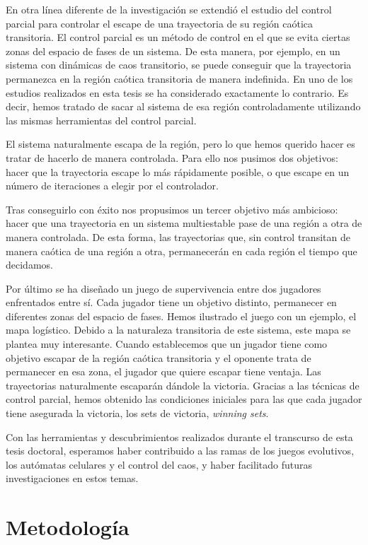 En otra línea diferente de la investigación se extendió el estudio del control parcial para controlar el escape de una trayectoria de su región caótica transitoria. El control parcial es un método de control en el que se evita ciertas zonas del espacio de fases de un sistema. De esta manera, por ejemplo, en un sistema con dinámicas de caos transitorio, se puede conseguir que la trayectoria permanezca en la región caótica transitoria de manera indefinida. En uno de los estudios realizados en esta tesis se ha considerado exactamente lo contrario. Es decir, hemos tratado de sacar al sistema de esa región controladamente utilizando las mismas herramientas del control parcial.

El sistema naturalmente escapa de la región, pero lo que hemos querido hacer es tratar de hacerlo de manera controlada. Para ello nos pusimos dos objetivos: hacer que la trayectoria escape lo más rápidamente posible, o que escape en un número de iteraciones a elegir por el controlador. 

Tras conseguirlo con éxito nos propusimos un tercer objetivo más ambicioso: hacer que una trayectoria en un sistema multiestable pase de una región a otra de manera controlada. De esta forma, las trayectorias que, sin control transitan de manera caótica de una región a otra, permanecerán en cada región el tiempo que decidamos. 

Por último se ha diseñado un juego de supervivencia entre dos jugadores enfrentados entre sí. Cada jugador tiene un objetivo distinto, permanecer en diferentes zonas del espacio de fases. Hemos ilustrado el juego con un ejemplo, el mapa logístico. Debido a la naturaleza transitoria de este sistema, este mapa se plantea muy interesante. Cuando establecemos que un jugador tiene como objetivo escapar de la región caótica transitoria y el oponente trata de permanecer en esa zona, el jugador que quiere escapar tiene ventaja. Las trayectorias naturalmente escaparán dándole la victoria. Gracias a las técnicas de control parcial, hemos obtenido las condiciones iniciales para las que cada jugador tiene asegurada la victoria, los sets de victoria, \textit{winning sets}. 

Con las herramientas y descubrimientos realizados durante el transcurso de esta tesis doctoral, esperamos haber contribuido a las ramas de los juegos evolutivos, los autómatas celulares y el control del caos, y haber facilitado futuras investigaciones en estos temas.

\section{Metodología}

